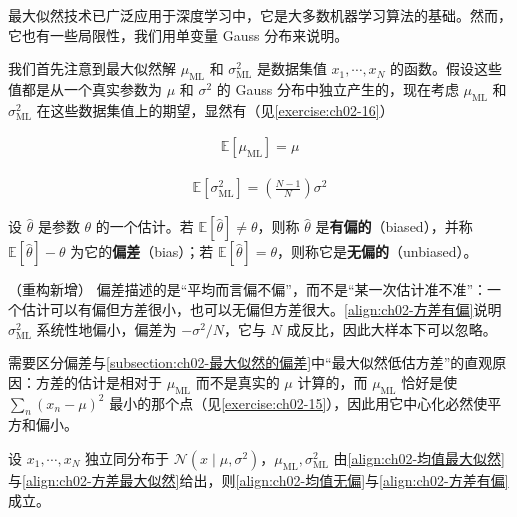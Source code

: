 \documentclass[../../main.tex]{subfiles}
\begin{document}
最大似然技术已广泛应用于深度学习中，它是大多数机器学习算法的基础。然而，它也有一些局限性，我们用单变量 Gauss 分布来说明。

我们首先注意到最大似然解 $\mu_{\mathrm{ML}}$ 和 $\sigma_{\mathrm{ML}}^{2}$ 是数据集值 $x_1,\cdots,x_N$ 的函数。假设这些值都是从一个真实参数为 $\mu$ 和 $\sigma^{2}$ 的 Gauss 分布中独立产生的，现在考虑 $\mu_{\mathrm{ML}}$ 和 $\sigma_{\mathrm{ML}}^{2}$ 在这些数据集值上的期望，显然有（见\cref{exercise:ch02-16}）

\begin{align}
  \mathbb{E}\left[\mu_{\mathrm{ML}}\right] = \mu
  \label{align:ch02-均值无偏}
\end{align}

\begin{align}
  \mathbb{E}\left[\sigma_{\mathrm{ML}}^{2}\right] = \left(\frac{N-1}{N}\right)\sigma^{2}
  \label{align:ch02-方差有偏}
\end{align}

\begin{definition}[偏差]\label{definition:ch02-偏差}
设 $\hat{\theta}$ 是参数 $\theta$ 的一个估计。若 $\mathbb{E}[\hat{\theta}]\neq\theta$，则称 $\hat{\theta}$ 是\textbf{有偏的}（biased），并称 $\mathbb{E}[\hat{\theta}]-\theta$ 为它的\textbf{偏差}（bias）；若 $\mathbb{E}[\hat{\theta}]=\theta$，则称它是\textbf{无偏的}（unbiased）。
\end{definition}

\begin{remark}（重构新增）
偏差描述的是“平均而言偏不偏”，而不是“某一次估计准不准”：一个估计可以有偏但方差很小，也可以无偏但方差很大。\eqref{align:ch02-方差有偏}说明 $\sigma_{\mathrm{ML}}^{2}$ 系统性地偏小，偏差为 $-\sigma^{2}/N$，它与 $N$ 成反比，因此大样本下可以忽略。

需要区分偏差与\cref{subsection:ch02-最大似然的偏差}中“最大似然低估方差”的直观原因：方差的估计是相对于 $\mu_{\mathrm{ML}}$ 而不是真实的 $\mu$ 计算的，而 $\mu_{\mathrm{ML}}$ 恰好是使 $\sum_n(x_n-\mu)^{2}$ 最小的那个点（见\cref{exercise:ch02-15}），因此用它中心化必然使平方和偏小。
\end{remark}

\begin{proposition}[最大似然估计的期望]\label{proposition:ch02-最大似然期望}
设 $x_1,\cdots,x_N$ 独立同分布于 $\mathcal{N}(x\mid\mu,\sigma^{2})$，$\mu_{\mathrm{ML}},\sigma_{\mathrm{ML}}^{2}$ 由\eqref{align:ch02-均值最大似然}与\eqref{align:ch02-方差最大似然}给出，则\eqref{align:ch02-均值无偏}与\eqref{align:ch02-方差有偏}成立。
\end{proposition}
\end{document}
